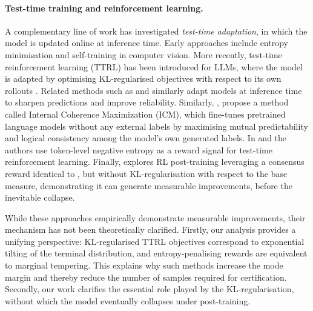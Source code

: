 \documentclass{article} %
\begin{document}
\paragraph{Test-time training and reinforcement learning.}  
A complementary line of work has investigated \emph{test-time adaptation}, in which the model is updated online at inference time. Early approaches include entropy minimisation and self-training in computer vision. More recently, test-time reinforcement learning (TTRL) has been introduced for LLMs, where the model is adapted by optimising KL-regularised objectives with respect to its own rollouts \citep{zuo2025ttrl}. Related methods such as \cite{akyurek2025ttt} and \cite{prasadself} similarly adapt models at inference time to sharpen predictions and improve reliability.   Similarly, \cite{wen2025unsupervised}, propose a method called Internal Coherence Maximization (ICM), which fine-tunes pretrained language models without any external labels by maximising mutual predictability and logical consistency among the model's own generated labels.  In \cite{prabhudesai2025maximizing} and \cite{kang2025scalable} the authors use token-level negative entropy as a reward signal for test-time reinforcement learning.  Finally, \cite{shafayat2025large} explores RL post-training leveraging a consensus reward identical to \cite{zuo2025ttrl}, but without KL-regularisation with respect to the base measure,  demonstrating it can generate measurable improvements, before the inevitable collapse.

While these approaches empirically demonstrate measurable improvements, their mechanism has not been theoretically clarified. Firstly, our analysis provides a unifying perspective: KL-regularised TTRL objectives correspond to exponential tilting of the terminal distribution, and entropy-penalising rewards are equivalent to marginal tempering. This explains why such methods increase the mode margin and thereby reduce the number of samples required for certification.   Secondly, our work clarifies the essential role played by the KL-regularisation, without which the model eventually collapses under post-training.
\end{document}
